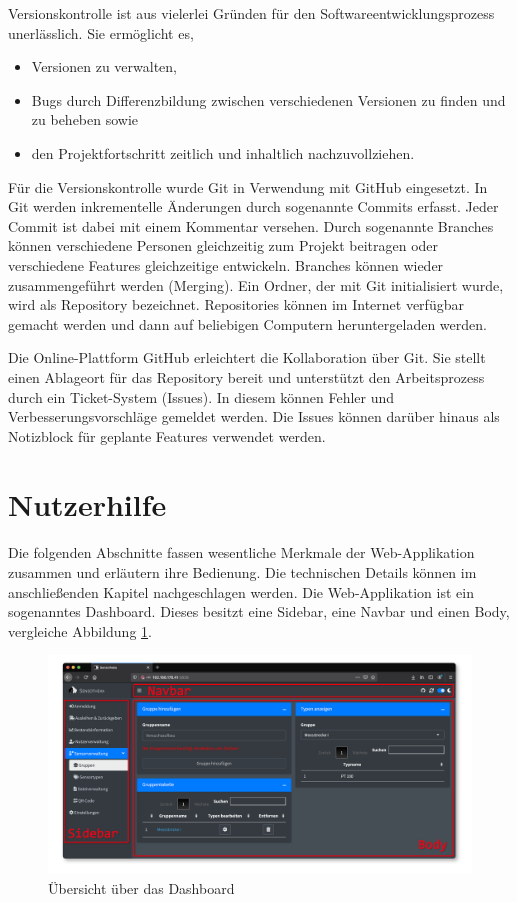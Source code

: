 \documentclass[
]{article}
\providecommand{\tightlist}{%
  \setlength{\itemsep}{0pt}\setlength{\parskip}{0pt}}
\begin{document}
Versionskontrolle ist aus vielerlei Gründen für den Softwareentwicklungsprozess unerlässlich. Sie ermöglicht es,

\begin{itemize}
\tightlist
\item
  Versionen zu verwalten,
\item
  Bugs durch Differenzbildung zwischen verschiedenen Versionen zu finden und zu beheben sowie
\item
  den Projektfortschritt zeitlich und inhaltlich nachzuvollziehen.
\end{itemize}

Für die Versionskontrolle wurde Git in Verwendung mit GitHub eingesetzt. In Git werden inkrementelle Änderungen durch sogenannte Commits erfasst. Jeder Commit ist dabei mit einem Kommentar versehen. Durch sogenannte Branches können verschiedene Personen gleichzeitig zum Projekt beitragen oder verschiedene Features gleichzeitige entwickeln. Branches können wieder zusammengeführt werden (Merging). Ein Ordner, der mit Git initialisiert wurde, wird als Repository bezeichnet. Repositories können im Internet verfügbar gemacht werden und dann auf beliebigen Computern heruntergeladen werden.

Die Online-Plattform GitHub erleichtert die Kollaboration über Git. Sie stellt einen Ablageort für das Repository bereit und unterstützt den Arbeitsprozess durch ein Ticket-System (Issues). In diesem können Fehler und Verbesserungsvorschläge gemeldet werden. Die Issues können darüber hinaus als Notizblock für geplante Features verwendet werden.

\hypertarget{user-guide}{%
\section{Nutzerhilfe}\label{user-guide}}

Die folgenden Abschnitte fassen wesentliche Merkmale der Web-Applikation zusammen und erläutern ihre Bedienung. Die technischen Details können im anschließenden Kapitel nachgeschlagen werden. Die Web-Applikation ist ein sogenanntes Dashboard. Dieses besitzt eine Sidebar, eine Navbar und einen Body, vergleiche Abbildung \ref{fig:app-overview}.

\begin{figure}
\centering
\includegraphics{./img/app_overview.png}
\caption{\label{fig:app-overview}Übersicht über das Dashboard}
\end{figure}
\end{document}
